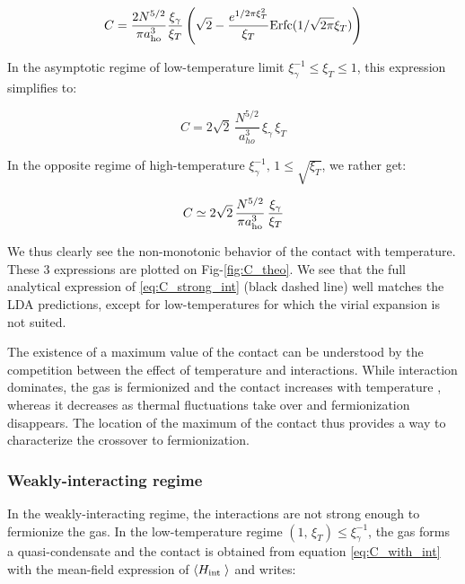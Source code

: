 \begin{equation}
    C = \frac{2 N^{5/2}}{\pi a_{\rm{ho}}^3} \frac{\xi_\gamma}{\xi_T} \left( \sqrt{2} - \frac{e^{1/2 \pi \xi_T^2}}{\xi_T} \textrm{Erfc}(1/\sqrt{2 \pi} \xi_T) \right)
    \label{eq:C_strong_int}
\end{equation}

In the asymptotic regime of low-temperature limit $\xi_\gamma^{-1} \leq \xi_T \leq 1$, this expression simplifies to:

\begin{equation}
    C = 2 \sqrt{2} \, \frac{N^{5/2}}{a_{ho}^3} \, \xi_\gamma \, \xi_T 
    \label{eq:strong_int_lowT}
\end{equation}

\noindent In the opposite regime of high-temperature $\xi_\gamma^{-1}, \, 1 \leq \sqrt{\xi_T}$, we rather get:

\begin{equation}
    C \simeq 2 \sqrt{2} \, \frac{N^{5/2}}{ \pi a_{\rm{ho}}^3} \, \frac{\xi_\gamma}{\xi_T} 
    \label{eq:strong_int_highT}
\end{equation}

\noindent We thus clearly see the non-monotonic behavior of the contact with temperature. These 3 expressions are plotted on Fig-\ref{fig:C_theo}. We see that the full analytical expression of \ref{eq:C_strong_int} (black dashed line) well matches the LDA predictions, except for low-temperatures for which the virial expansion is not suited.

The existence of a maximum value of the contact can be understood by the competition between the effect of temperature and interactions. While interaction dominates, the gas is fermionized and the contact increases with temperature \cite{vignolo2013universal}, whereas it decreases as thermal fluctuations take over and fermionization disappears. The location of the maximum of the contact thus provides a way to characterize the crossover to fermionization. 

\subsubsection{Weakly-interacting regime}

In the weakly-interacting regime, the interactions are not strong enough to fermionize the gas. In the low-temperature regime $(1, \, \xi_T) \leq \xi_\gamma^{-1}$, the gas forms a quasi-condensate and the contact is obtained from equation \ref{eq:C_with_int} with the mean-field expression of $\langle H_{\text {int }}\rangle$ and writes:

